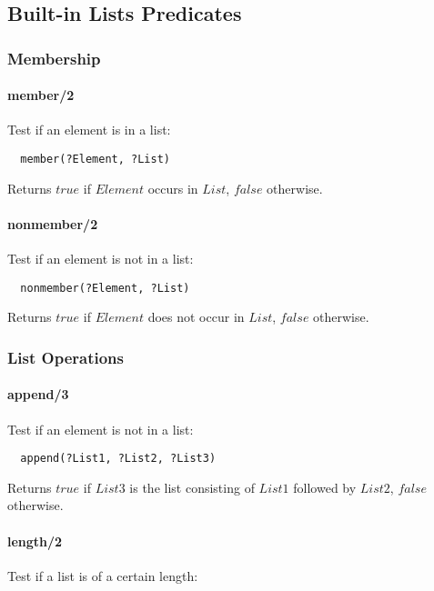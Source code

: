 \documentclass{article}
\begin{document}
\begin{multicols}{2}
  \subsection{Built-in Lists Predicates}
  
  \subsubsection{Membership}
  
  \paragraph{member/2} Test if an element is in a list:
  
  \begin{lstlisting}
  member(?Element, ?List)
  \end{lstlisting} 
  
  Returns $true$ if $Element$ occurs in $List$, $false$ otherwise.

  \paragraph{nonmember/2} Test if an element is not in a list:
  
  \begin{lstlisting}
  nonmember(?Element, ?List)
  \end{lstlisting} 
  
 Returns $true$ if $Element$ does not occur in $List$, $false$ otherwise.
  
  \subsubsection{List Operations}

  \paragraph{append/3} Test if an element is not in a list:  
  
  \begin{lstlisting}
  append(?List1, ?List2, ?List3)
  \end{lstlisting} 
  
  Returns $true$ if $List3$ is the list consisting of $List1$ followed by $List2$, $false$ otherwise.
  
  \paragraph{length/2} Test if a list is of a certain length:
  

\end{multicols}
\end{document}
